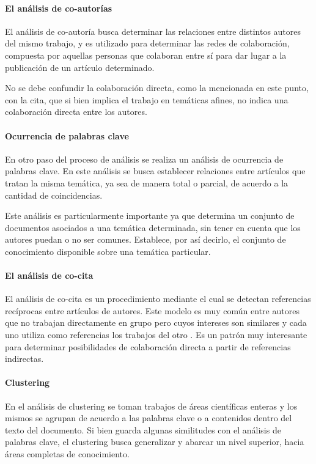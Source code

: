 \paragraph{El análisis de co-autorías}
El análisis de co-autoría busca determinar las relaciones entre distintos autores del mismo trabajo, y es utilizado para determinar las redes de colaboración, compuesta por aquellas personas que colaboran entre sí para dar lugar a la publicación de un artículo determinado. 

No se debe confundir la colaboración directa, como la mencionada en este punto, con la cita, que si bien implica el trabajo en temáticas afines, no indica una colaboración directa entre los autores.

\paragraph{Ocurrencia de palabras clave}
En otro paso del proceso de análisis se realiza un análisis de ocurrencia de palabras clave. En este análisis se busca establecer relaciones entre artículos que tratan la misma temática, ya sea de manera total o parcial, de acuerdo a la cantidad de coincidencias. 

Este análisis es particularmente importante ya que determina un conjunto de documentos asociados a una temática determinada, sin tener en cuenta que los autores puedan o no ser comunes. Establece, por así decirlo, el conjunto de conocimiento disponible sobre una temática particular.

\paragraph{El análisis de co-cita}
El análisis de co-cita es un procedimiento mediante el cual se detectan referencias recíprocas entre artículos de autores. Este modelo es muy común entre autores que no trabajan directamente en grupo pero cuyos intereses son similares y cada uno utiliza como referencias los trabajos del otro \cite{wei2020document}. Es un patrón muy interesante para determinar posibilidades de colaboración directa a partir de referencias indirectas.

\paragraph{Clustering}
En el análisis de clustering \cite{liu2018co} se toman trabajos de áreas científicas enteras y los mismos se agrupan de acuerdo a las palabras clave o a contenidos dentro del texto del documento. Si bien guarda algunas similitudes con el análisis de palabras clave, el clustering busca generalizar y abarcar un nivel superior, hacia áreas completas de conocimiento.

